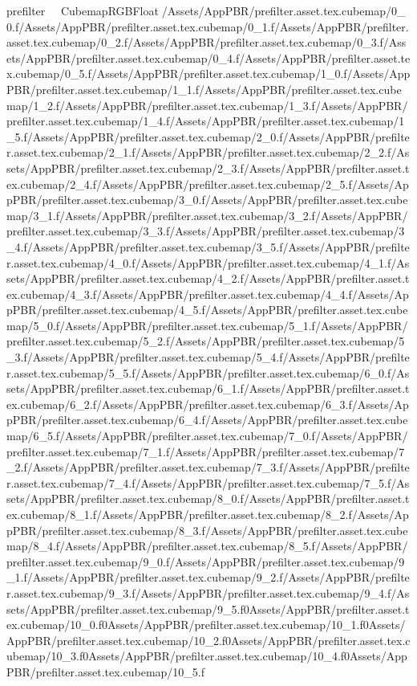	   prefilter               CubemapRGBFloat   /   Assets/AppPBR/prefilter.asset.tex.cubemap/0_0.f/   Assets/AppPBR/prefilter.asset.tex.cubemap/0_1.f/   Assets/AppPBR/prefilter.asset.tex.cubemap/0_2.f/   Assets/AppPBR/prefilter.asset.tex.cubemap/0_3.f/   Assets/AppPBR/prefilter.asset.tex.cubemap/0_4.f/   Assets/AppPBR/prefilter.asset.tex.cubemap/0_5.f/   Assets/AppPBR/prefilter.asset.tex.cubemap/1_0.f/   Assets/AppPBR/prefilter.asset.tex.cubemap/1_1.f/   Assets/AppPBR/prefilter.asset.tex.cubemap/1_2.f/   Assets/AppPBR/prefilter.asset.tex.cubemap/1_3.f/   Assets/AppPBR/prefilter.asset.tex.cubemap/1_4.f/   Assets/AppPBR/prefilter.asset.tex.cubemap/1_5.f/   Assets/AppPBR/prefilter.asset.tex.cubemap/2_0.f/   Assets/AppPBR/prefilter.asset.tex.cubemap/2_1.f/   Assets/AppPBR/prefilter.asset.tex.cubemap/2_2.f/   Assets/AppPBR/prefilter.asset.tex.cubemap/2_3.f/   Assets/AppPBR/prefilter.asset.tex.cubemap/2_4.f/   Assets/AppPBR/prefilter.asset.tex.cubemap/2_5.f/   Assets/AppPBR/prefilter.asset.tex.cubemap/3_0.f/   Assets/AppPBR/prefilter.asset.tex.cubemap/3_1.f/   Assets/AppPBR/prefilter.asset.tex.cubemap/3_2.f/   Assets/AppPBR/prefilter.asset.tex.cubemap/3_3.f/   Assets/AppPBR/prefilter.asset.tex.cubemap/3_4.f/   Assets/AppPBR/prefilter.asset.tex.cubemap/3_5.f/   Assets/AppPBR/prefilter.asset.tex.cubemap/4_0.f/   Assets/AppPBR/prefilter.asset.tex.cubemap/4_1.f/   Assets/AppPBR/prefilter.asset.tex.cubemap/4_2.f/   Assets/AppPBR/prefilter.asset.tex.cubemap/4_3.f/   Assets/AppPBR/prefilter.asset.tex.cubemap/4_4.f/   Assets/AppPBR/prefilter.asset.tex.cubemap/4_5.f/   Assets/AppPBR/prefilter.asset.tex.cubemap/5_0.f/   Assets/AppPBR/prefilter.asset.tex.cubemap/5_1.f/   Assets/AppPBR/prefilter.asset.tex.cubemap/5_2.f/   Assets/AppPBR/prefilter.asset.tex.cubemap/5_3.f/   Assets/AppPBR/prefilter.asset.tex.cubemap/5_4.f/   Assets/AppPBR/prefilter.asset.tex.cubemap/5_5.f/   Assets/AppPBR/prefilter.asset.tex.cubemap/6_0.f/   Assets/AppPBR/prefilter.asset.tex.cubemap/6_1.f/   Assets/AppPBR/prefilter.asset.tex.cubemap/6_2.f/   Assets/AppPBR/prefilter.asset.tex.cubemap/6_3.f/   Assets/AppPBR/prefilter.asset.tex.cubemap/6_4.f/   Assets/AppPBR/prefilter.asset.tex.cubemap/6_5.f/   Assets/AppPBR/prefilter.asset.tex.cubemap/7_0.f/   Assets/AppPBR/prefilter.asset.tex.cubemap/7_1.f/   Assets/AppPBR/prefilter.asset.tex.cubemap/7_2.f/   Assets/AppPBR/prefilter.asset.tex.cubemap/7_3.f/   Assets/AppPBR/prefilter.asset.tex.cubemap/7_4.f/   Assets/AppPBR/prefilter.asset.tex.cubemap/7_5.f/   Assets/AppPBR/prefilter.asset.tex.cubemap/8_0.f/   Assets/AppPBR/prefilter.asset.tex.cubemap/8_1.f/   Assets/AppPBR/prefilter.asset.tex.cubemap/8_2.f/   Assets/AppPBR/prefilter.asset.tex.cubemap/8_3.f/   Assets/AppPBR/prefilter.asset.tex.cubemap/8_4.f/   Assets/AppPBR/prefilter.asset.tex.cubemap/8_5.f/   Assets/AppPBR/prefilter.asset.tex.cubemap/9_0.f/   Assets/AppPBR/prefilter.asset.tex.cubemap/9_1.f/   Assets/AppPBR/prefilter.asset.tex.cubemap/9_2.f/   Assets/AppPBR/prefilter.asset.tex.cubemap/9_3.f/   Assets/AppPBR/prefilter.asset.tex.cubemap/9_4.f/   Assets/AppPBR/prefilter.asset.tex.cubemap/9_5.f0   Assets/AppPBR/prefilter.asset.tex.cubemap/10_0.f0   Assets/AppPBR/prefilter.asset.tex.cubemap/10_1.f0   Assets/AppPBR/prefilter.asset.tex.cubemap/10_2.f0   Assets/AppPBR/prefilter.asset.tex.cubemap/10_3.f0   Assets/AppPBR/prefilter.asset.tex.cubemap/10_4.f0   Assets/AppPBR/prefilter.asset.tex.cubemap/10_5.f